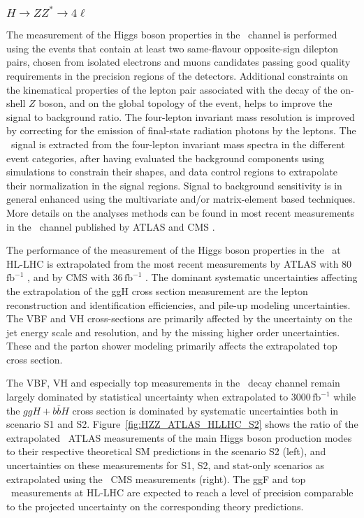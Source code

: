 \subsubsection{$H \to ZZ^* \to 4\ell$}

The measurement of the Higgs boson properties in the \HZZ\ channel is performed using the events that contain at least two same-flavour opposite-sign dilepton pairs, chosen from isolated electrons and muons candidates passing good quality requirements in the precision regions of the detectors. Additional constraints on the kinematical properties of the lepton pair associated with the decay of the on-shell $Z$ boson, and on the global topology of the event, helps to improve the signal to background ratio. The four-lepton invariant mass resolution is improved by correcting for the emission of final-state radiation photons by the leptons.
The \HZZ\ signal is extracted from the four-lepton invariant mass spectra in the different event categories, after having evaluated the background components using simulations to constrain their shapes, and data control regions to extrapolate their normalization in the signal regions. Signal to background sensitivity is in general enhanced using the multivariate and/or matrix-element based techniques. More details on the analyses methods can be found in most recent measurements in the \HZZ\ channel published by ATLAS \cite{ATLAS:2018bsg} and CMS \cite{Sirunyan:2017exp}.

The performance of the measurement of the Higgs boson properties in the \HZZ\ at HL-LHC is extrapolated from the most recent measurements by ATLAS with 80\,$\mathrm{fb}^{-1}$ \cite{ATLAS:2018bsg}, and by CMS with 36\,$\mathrm{fb}^{-1}$ \cite{Sirunyan:2017exp}. The dominant systematic uncertainties affecting the extrapolation of the ggH cross section measurement are the lepton reconstruction and identification efficiencies, and pile-up modeling uncertainties. The VBF and VH cross-sections are primarily affected by the uncertainty on the jet energy scale and resolution, and by the
missing higher order uncertainties.
These and
the parton shower modeling primarily affects the extrapolated top cross section.

The VBF, VH and especially top measurements in the \HZZ\ decay channel remain largely dominated by statistical uncertainty when extrapolated to 3000\,$\mathrm{fb}^{-1}$ while the $ggH+b\bar{b}H$ cross section is dominated by systematic uncertainties both in scenario S1 and S2.
%
Figure~\ref{fig:HZZ_ATLAS_HLLHC_S2} shows the ratio of the extrapolated \HZZ\ ATLAS measurements of the main Higgs boson production modes to their respective theoretical SM predictions in the scenario S2 (left), and uncertainties on these measurements for S1, S2, and stat-only scenarios as extrapolated using the \HZZ\ CMS measurements (right). The ggF and top \HZZ\ measurements at HL-LHC are expected to reach a level of precision comparable to the projected uncertainty on the corresponding theory predictions.

